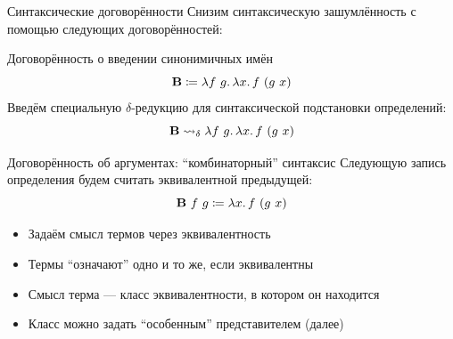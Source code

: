     \begin{frame}{Синтаксические договорённости}
        Снизим синтаксическую зашумлённость с помощью следующих договорённостей:
        \pause
        \begin{block}{Договорённость о введении синонимичных имён}
            \[
                \mathbf{B} \coloneqq \lambda f ~ g\ldotp \lambda x\ldotp f~(g~x)
            \]
            \pause
            Введём специальную $\delta$-редукцию для синтаксической подстановки определений:
            \[
                \mathbf{B} \rightsquigarrow_{\delta} \lambda f ~ g\ldotp \lambda x\ldotp f~(g~x)
            \]
        \end{block}
        \pause
        \begin{block}{Договорённость об аргументах: ``комбинаторный'' синтаксис}
            Следующую запись определения будем считать эквивалентной предыдущей:
            \[
                \mathbf{B} ~ f ~ g \coloneqq \lambda x\ldotp f~(g~x)
            \]
        \end{block}
    \end{frame}


    \begin{frame}[fragile]{\subsecname}
        \begin{itemize}
            \item Задаём смысл термов через эквивалентность
            \item Термы ``означают'' одно и то же, если эквивалентны
            \item Смысл терма --- класс эквивалентности, в котором он находится
            \item Класс можно задать ``особенным'' представителем (далее)
        \end{itemize}
    \end{frame}

